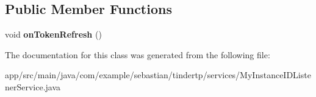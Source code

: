 \subsection*{Public Member Functions}
\begin{DoxyCompactItemize}
\item 
void {\bfseries on\+Token\+Refresh} ()\hypertarget{classcom_1_1example_1_1sebastian_1_1tindertp_1_1services_1_1MyInstanceIDListenerService_a5b9108885564406c520a02b6e57bd20c}{}\label{classcom_1_1example_1_1sebastian_1_1tindertp_1_1services_1_1MyInstanceIDListenerService_a5b9108885564406c520a02b6e57bd20c}

\end{DoxyCompactItemize}


The documentation for this class was generated from the following file\+:\begin{DoxyCompactItemize}
\item 
app/src/main/java/com/example/sebastian/tindertp/services/My\+Instance\+I\+D\+Listener\+Service.\+java\end{DoxyCompactItemize}
